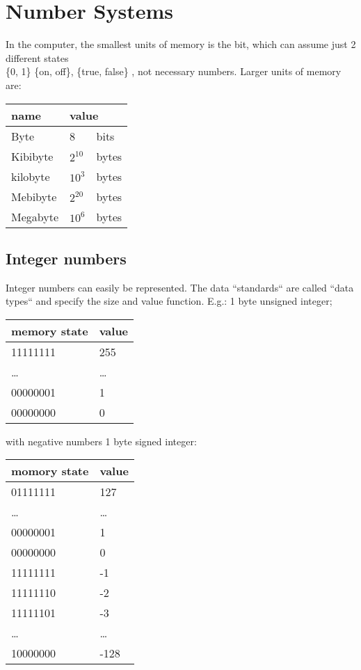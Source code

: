 \chapter{Number Systems}
In the computer, the smallest units of memory is the bit, which can assume
just 2 different states \\
\{0, 1\} \{on, off\}, \{true, false\} , not necessary numbers.
Larger units of memory are:
\begin{center}
    \begin{tabular}{ l l @{ }l}
        \toprule
        name & \multicolumn{2}{l}{value} \\
        \midrule
        Byte     & 8        & bits  \\
        Kibibyte & $2^{10}$ & bytes \\
        kilobyte & $10^3$   & bytes \\
        Mebibyte & $2^{20}$ & bytes \\
        Megabyte & $10^6$   & bytes \\
        \bottomrule
    \end{tabular}
\end{center}


\section{Integer numbers}\label{sec:integer-numbers}
Integer numbers can easily be represented.
The data ``standards`` are called ``data types`` and specify the size and value function.
E.g.: 1 byte unsigned integer;
\begin{center}
    \begin{tabular}{ l | l }
        memory state & value  \\
        \hline
        11111111     & 255    \\
        \ldots       & \ldots \\
        00000001     & 1      \\
        00000000     & 0
    \end{tabular}
\end{center}

with negative numbers \textrightarrow{} 1 byte signed integer:
\begin{center}
    \begin{tabular}{ l | l }
        momory state & value  \\
        \hline
        01111111     & 127    \\
        \ldots       & \ldots \\
        00000001     & 1      \\
        00000000     & 0      \\
        11111111     & -1     \\
        11111110     & -2     \\
        11111101     & -3     \\
        \ldots       & \ldots \\
        10000000     & -128
    \end{tabular}
\end{center}


